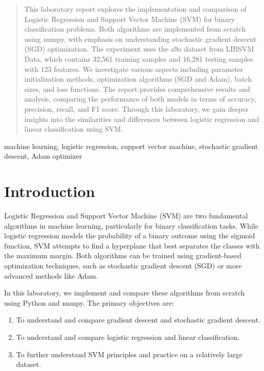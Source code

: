 \documentclass[journal, a4paper]{IEEEtran}
\begin{document}
\begin{abstract}
This laboratory report explores the implementation and comparison of Logistic Regression and Support Vector Machine (SVM) for binary classification problems. Both algorithms are implemented from scratch using numpy, with emphasis on understanding stochastic gradient descent (SGD) optimization. The experiment uses the a9a dataset from LIBSVM Data, which contains 32,561 training samples and 16,281 testing samples with 123 features. We investigate various aspects including parameter initialization methods, optimization algorithms (SGD and Adam), batch sizes, and loss functions. The report provides comprehensive results and analysis, comparing the performance of both models in terms of accuracy, precision, recall, and F1 score. Through this laboratory, we gain deeper insights into the similarities and differences between logistic regression and linear classification using SVM.
\end{abstract}

\begin{IEEEkeywords}
machine learning, logistic regression, support vector machine, stochastic gradient descent, Adam optimizer
\end{IEEEkeywords}

\section{Introduction}
Logistic Regression and Support Vector Machine (SVM) are two fundamental algorithms in machine learning, particularly for binary classification tasks. While logistic regression models the probability of a binary outcome using the sigmoid function, SVM attempts to find a hyperplane that best separates the classes with the maximum margin. Both algorithms can be trained using gradient-based optimization techniques, such as stochastic gradient descent (SGD) or more advanced methods like Adam.

In this laboratory, we implement and compare these algorithms from scratch using Python and numpy. The primary objectives are:

\begin{enumerate}
    \item To understand and compare gradient descent and stochastic gradient descent.
    \item To understand and compare logistic regression and linear classification.
    \item To further understand SVM principles and practice on a relatively large dataset.
\end{enumerate}
\end{document}
